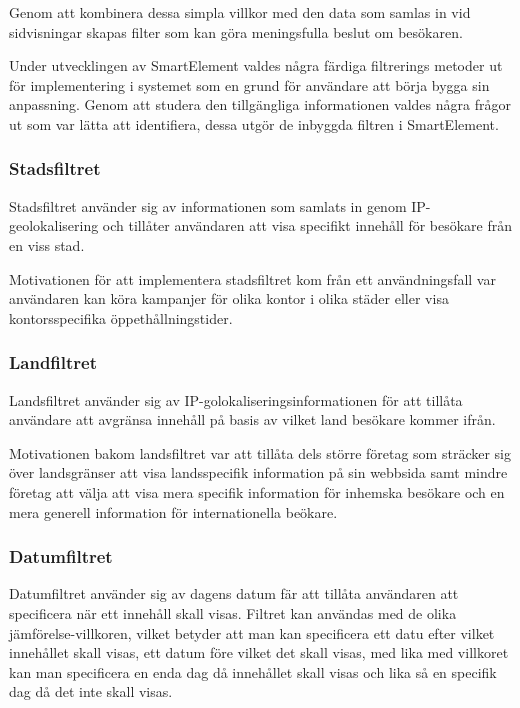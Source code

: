 Genom att kombinera dessa simpla villkor med den data som samlas in vid sidvisningar skapas filter som kan göra meningsfulla beslut om besökaren.

Under utvecklingen av SmartElement valdes några färdiga filtrerings metoder ut för implementering i systemet som en grund för användare att börja bygga sin anpassning. Genom att studera den tillgängliga informationen valdes några frågor ut som var lätta att identifiera, dessa utgör de inbyggda filtren i SmartElement.

\subsubsection{Stadsfiltret}

Stadsfiltret använder sig av informationen som samlats in genom IP-geolokalisering och tillåter användaren att visa specifikt innehåll för besökare från en viss stad.

Motivationen för att implementera stadsfiltret kom från ett användningsfall var användaren kan köra kampanjer för olika kontor i olika städer eller visa kontorsspecifika öppethållningstider.

\subsubsection{Landfiltret}

Landsfiltret använder sig av IP-golokaliseringsinformationen för att tillåta användare att avgränsa innehåll på basis av vilket land besökare kommer ifrån.

Motivationen bakom landsfiltret var att tillåta dels större företag som sträcker sig över landsgränser att visa landsspecifik information på sin webbsida samt mindre företag att välja att visa mera specifik information för inhemska besökare och en mera generell information för internationella beökare.

\subsubsection{Datumfiltret}

Datumfiltret använder sig av dagens datum fär att tillåta användaren att specificera när ett innehåll skall visas. Filtret kan användas med de olika jämförelse-villkoren, vilket betyder att man kan specificera ett datu efter vilket innehållet skall visas, ett datum före vilket det skall visas, med lika med villkoret kan man specificera en enda dag då innehållet skall visas och lika så en specifik dag då det inte skall visas.

